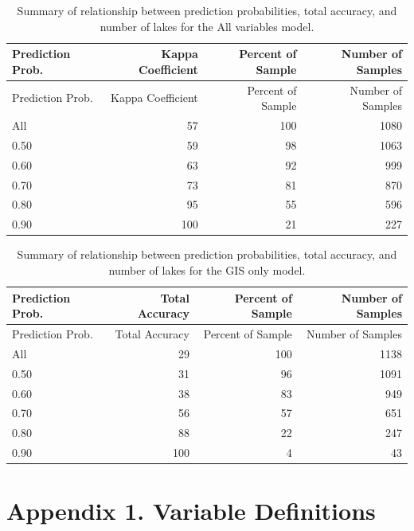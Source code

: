 \documentclass[12pt,]{article}
\begin{document}
\newpage

\begin{longtable}[c]{@{}lrrr@{}}
\caption{Summary of relationship between prediction probabilities, total
accuracy, and number of lakes for the All variables model.
\label{tab:cond_prob_tab_all}}\tabularnewline
\toprule
Prediction Prob. & Kappa Coefficient & Percent of Sample & Number of
Samples\tabularnewline
\midrule
\endfirsthead
\toprule
Prediction Prob. & Kappa Coefficient & Percent of Sample & Number of
Samples\tabularnewline
\midrule
\endhead
All & 57 & 100 & 1080\tabularnewline
0.50 & 59 & 98 & 1063\tabularnewline
0.60 & 63 & 92 & 999\tabularnewline
0.70 & 73 & 81 & 870\tabularnewline
0.80 & 95 & 55 & 596\tabularnewline
0.90 & 100 & 21 & 227\tabularnewline
\bottomrule
\end{longtable}

\newpage

\begin{longtable}[c]{@{}lrrr@{}}
\caption{Summary of relationship between prediction probabilities, total
accuracy, and number of lakes for the GIS only model.
\label{tab:cond_prob_tab_gis}}\tabularnewline
\toprule
Prediction Prob. & Total Accuracy & Percent of Sample & Number of
Samples\tabularnewline
\midrule
\endfirsthead
\toprule
Prediction Prob. & Total Accuracy & Percent of Sample & Number of
Samples\tabularnewline
\midrule
\endhead
All & 29 & 100 & 1138\tabularnewline
0.50 & 31 & 96 & 1091\tabularnewline
0.60 & 38 & 83 & 949\tabularnewline
0.70 & 56 & 57 & 651\tabularnewline
0.80 & 88 & 22 & 247\tabularnewline
0.90 & 100 & 4 & 43\tabularnewline
\bottomrule
\end{longtable}

\newpage

\section{Appendix 1. Variable
Definitions}\label{appendix-1.-variable-definitions}
\end{document}
